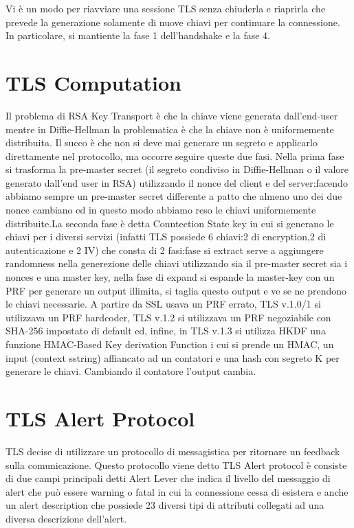 \documentclass{article}
\begin{document}
Vi è un modo per riavviare una sessione TLS senza chiuderla e riaprirla che prevede la generazione solamente di nuove chiavi per continuare la connessione\@. In particolare, si mantiente la fase 1 dell'handshake e la fase 4\@.

\section{TLS Computation}
Il problema di RSA Key Transport è che la chiave viene generata dall'end-user mentre in Diffie-Hellman la problematica è che la chiave non è uniformemente distribuita\@. Il succo è che non si deve mai generare un segreto e applicarlo direttamente nel protocollo, ma occorre seguire queste due fasi\@.\newline
Nella prima fase si trasforma la pre-master secret (il segreto condiviso in Diffie-Hellman o il valore generato dall'end user in RSA) utilizzando il nonce del client e del server: facendo abbiamo sempre un pre-master secret differente a patto che almeno uno dei due nonce cambiano ed in questo modo abbiamo reso le chiavi uniformemente distribuite\@.\newline La seconda fase è detta Conntection State key in cui si generano le chiavi per i diversi servizi (infatti TLS possiede 6 chiavi:\@2 di encryption,2 di autenticazione e 2 IV) che consta di 2 fasi:\@la fase si extract serve a aggiungere randomness nella generezione delle chiavi utilizzando sia il pre-master secret sia i nonces e una master key, nella fase di expand si espande la master-key con un PRF per generare un output illimita, si taglia questo output e ve se ne prendono le chiavi necessarie\@.\newline
A partire da SSL usava un PRF errato, TLS v.1.0/1 si utilizzava un PRF hardcoder, TLS v.1.2 si utilizzava un PRF negoziabile con SHA-256 impostato di default ed, infine, in TLS v.1.3 si utilizza HKDF una funzione HMAC-Based Key derivation Function i cui si prende un HMAC, un input (context sstring) affiancato ad un contatori e una hash con segreto K per generare le chiavi\@. Cambiando il contatore l'output cambia\@.
\section{TLS Alert Protocol}
TLS decise di utilizzare un protocollo di messagistica per ritornare un feedback sulla comunicazione\@. Questo protocollo viene detto TLS Alert protocol è consiste di due campi principali detti Alert Lever che indica il livello del messaggio di alert che può essere warning o fatal in cui la connessione cessa di esistera e anche un alert description che possiede 23 diversi tipi di attributi collegati ad una diversa descrizione dell'alert\@.
\end{document}
